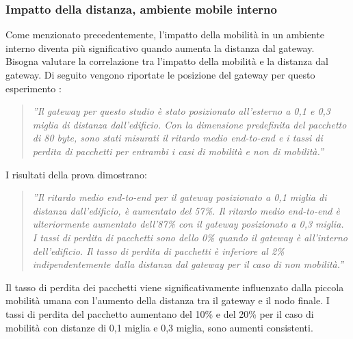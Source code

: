 \documentclass[a4paper]{report} %
\begin{document}
\subsubsection{Impatto della distanza, ambiente mobile interno}
Come menzionato precedentemente, l'impatto della mobilità in un ambiente interno diventa più significativo quando aumenta la distanza dal gateway. Bisogna valutare la correlazione tra l'impatto della mobilità e la distanza dal gateway. 
Di seguito vengono riportate le posizione del gateway per questo esperimento \cite{art:rif.47}:
\begin{quote}
	\textit{''Il gateway per questo studio è stato posizionato all'esterno a 0,1 e 0,3 miglia di distanza dall'edificio. Con la dimensione predefinita del pacchetto di 80 byte, sono stati misurati il ritardo medio end-to-end e i tassi di perdita di pacchetti per entrambi i casi di mobilità e non di mobilità.''}
\end{quote}
I risultati della prova dimostrano:
\begin{quote}
	\textit{''Il ritardo medio end-to-end per il gateway posizionato a 0,1 miglia di distanza dall'edificio, è aumentato del 57\%. Il ritardo medio end-to-end è ulteriormente aumentato dell'87\% con il gateway posizionato a 0,3 miglia.
	I tassi di perdita di pacchetti sono dello 0\% quando il gateway è all'interno dell'edificio. Il tasso di perdita di pacchetti è inferiore al 2\% indipendentemente dalla distanza dal gateway per il caso di non mobilità.''}
\end{quote}
Il tasso di perdita dei pacchetti viene significativamente influenzato dalla piccola mobilità umana con l'aumento della distanza tra il gateway e il nodo finale. I tassi di perdita del pacchetto aumentano del 10\% e del 20\% per il caso di mobilità con distanze di 0,1 miglia e 0,3 miglia, sono aumenti consistenti.
\end{document}
